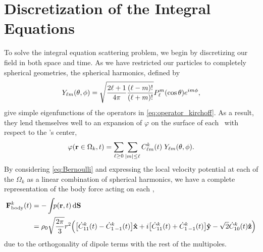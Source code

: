\section{Discretization of the Integral Equations}

To solve the integral equation scattering problem, we begin by discretizing our field in both space and time.
As we have restricted our particles to completely spherical geometries, the spherical harmonics, defined by
\begin{equation} \label{eq:Ylms}
  Y_{\ell m}\quantity(\theta, \phi) = \sqrt{\frac{2\ell + 1}{4\pi}\frac{\quantity(\ell - m)!}{\quantity(\ell + m)!}}P_\ell^m\quantity(\cos\theta)e^{i m \phi},
\end{equation}
give simple eigenfunctions of the operators in \cref{eq:operator_kirchoff}.
As a result, they lend themselves well to an expansion of $\varphi$ on the surface of each \bubble\ with respect to the \bubble's center,
\begin{equation} \label{eq:potential_expansion}
  \varphi(\vb{r}\in\Omega_k, t) = \sum_{\ell \ge 0} \sum_{\abs{m} \le \ell} C^k_{\ell m}(t) \; Y_{\ell m}\qty(\theta, \phi).
\end{equation}
By considering \cref{eq:Bernoulli} and expressing the local velocity potential at each of the $\Omega_k$ as a linear combination of spherical harmonics, we have a complete representation of the body force acting on each \bubble,
\begin{align}
  \vb{F}_\text{body}^k(t) &= - \int_{} p(\vb{r}, t) \dd{\vb{S}} \nonumber \\
  &= \rho_0 \sqrt{\frac{2\pi}{3}}r^2 \Big(\qty[\dot{C}^k_{11}(t) - \dot{C}^k_{1\, -1}(t)]\vu{x} + i\qty[\dot{C}^k_{11}(t) + \dot{C}^k_{1\,-1}(t)]\vu{y} - \sqrt{2}\dot{C}^k_{10}(t)\vu{z}\Big)
\end{align}
due to the orthogonality of dipole terms with the rest of the multipoles.

